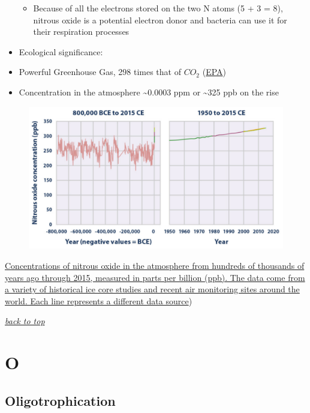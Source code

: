 \documentclass[]{book}
\providecommand{\tightlist}{%
  \setlength{\itemsep}{0pt}\setlength{\parskip}{0pt}}
\theoremstyle{definition}
\theoremstyle{definition}
\theoremstyle{definition}
\theoremstyle{remark}
\begin{document}
\begin{itemize}
  \begin{itemize}
  \tightlist
  \item
    Because of all the electrons stored on the two N atoms (5 + 3 = 8),
    nitrous oxide is a potential electron donor and bacteria can use it
    for their respiration processes
  \end{itemize}
\item
  Ecological significance:
\item
  Powerful Greenhouse Gas, 298 times that of \(CO_2\)
  (\href{https://www.epa.gov/sites/production/files/2015-07/documents/emission-factors_2014.pdf}{EPA})
\item
  Concentration in the atmosphere \textasciitilde{}0.0003 ppm or
  \textasciitilde{}325 ppb on the rise
\end{itemize}

\begin{figure}
\centering
\includegraphics{pictures/N2O_concentrations.png}
\caption{}
\end{figure}

\href{https://www.epa.gov/sites/production/files/2016-08/documents/print_ghg-concentrations-2016.pdf}{Concentrations
of nitrous oxide in the atmosphere from hundreds of thousands of years
ago through 2015, measured in parts per billion (ppb). The data come
from a variety of historical ice core studies and recent air monitoring
sites around the world. Each line represents a different data
source})\citep{Epa2016-yj}

\emph{\protect\hyperlink{top}{back to top}}

\section{O}\label{o}

\subsection{Oligotrophication}\label{oligotrophication}
\end{document}
